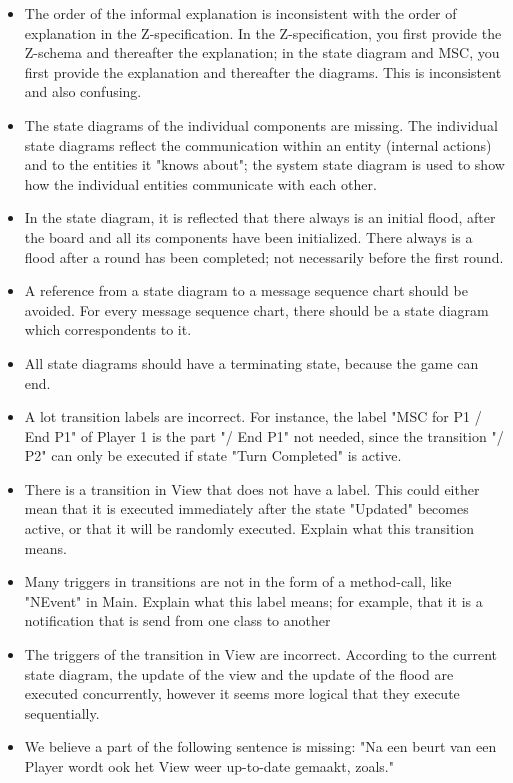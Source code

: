\documentclass[a4paper,11pt]{article}
\begin{document}
    \begin{itemize}
        \item The order of the informal explanation is inconsistent with the order of explanation in the Z-specification. In the Z-specification, you first provide the Z-schema and thereafter the explanation; in the state diagram and MSC, you first provide the explanation and thereafter the diagrams. This is inconsistent and also confusing.
        \item The state diagrams of the individual components are missing. The individual state diagrams reflect the communication within an entity (internal actions) and to the entities it "knows about"; the system state diagram is used to show how the individual entities communicate with each other.
        \item In the state diagram, it is reflected that there always is an initial flood, after the board and all its components have been initialized. There always is a flood after a round has been completed; not necessarily before the first round.
        \item A reference from a state diagram to a message sequence chart should be avoided. For every message sequence chart, there should be a state diagram which correspondents to it.
        \item All state diagrams should have a terminating state, because the game can end.
        \item A lot transition labels are incorrect. For instance, the label "MSC for P1 / End P1" of Player 1 is the part "/ End P1" not needed, since the transition "/ P2" can only be executed if state "Turn Completed" is active.
        \item There is a transition in View that does not have a label. This could either mean that it is executed immediately after the state "Updated" becomes active, or that it will be randomly executed. Explain what this transition means.
        \item Many triggers in transitions are not in the form of a method-call, like "NEvent" in Main. Explain what this label means; for example, that it is a notification that is send from one class to another
        \item The triggers of the transition in View are incorrect. According to the current state diagram, the update of the view and the update of the flood are executed concurrently, however it seems more logical that they execute sequentially.
        \item We believe a part of the following sentence is missing: "Na een beurt van een Player wordt ook het View weer up-to-date gemaakt, zoals."
    \end{itemize}
\end{document}
